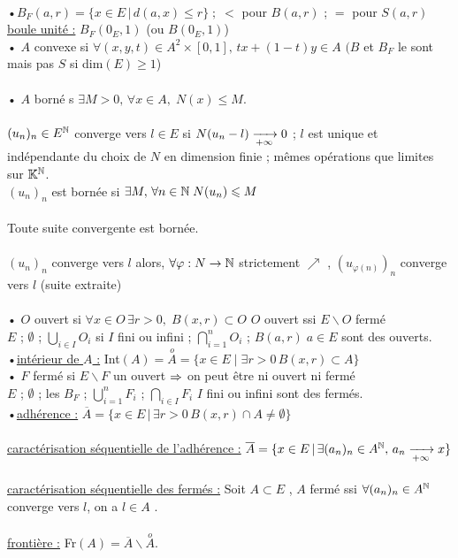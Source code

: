 \documentclass[12 pt]{exampleclass}
\begin{document}
\text{}\\
•$B_F(a,r) = \{x\in E \,|\, d(a,x)\leqslant r\} \; ; \; <$ pour $B(a,r)$ ; $ =$ pour $S(a,r)$\\
\underline{boule unité :} $B_F(0_E,1)$ \; (ou $B(0_E,1)$)\\
• $A$ convexe si $\forall(x,y,t)\in A^2\times [0,1], \, tx+(1-t)y \in A$  $(B$ et $B_F$ le sont mais pas $S$ si dim$(E) \geqslant 1$)\\
\text{}\\
• $A$ borné s $\exists M> 0, \, \forall x\in A, \; N(x)\leqslant M$.\\
\text{}\\
$(u_n)_n\in E^{\mathbb{N}}$ converge vers $l\in E$ si $N(u_n - l) \xrightarrow[+\infty]{} 0$ ; $l$ est unique et indépendante du choix de $N$ en dimension finie ; mêmes opérations que limites sur $\mathbb{K}^{\mathbb{N}}$.\\
$(u_n)_n$ est bornée si $\exists M, \, \forall n\in \mathbb{N} \; N(u_n)\leqslant M$\\
\text{}\\
Toute suite convergente est bornée.\\
\text{}\\
$(u_n)_n$ converge vers $l$ alors, $\forall \varphi : N \to \mathbb{N}$ strictement $\nearrow$ , $(u_{\varphi(n)})_n$ converge vers $l$ (suite extraite)\\
\text{}\\
• $O$ ouvert si $\forall x\in O \, \exists r>0 , \; B(x,r)\subset O$ \qquad \qquad \qquad $O$ ouvert ssi $E\backslash O$ fermé\\
$E$ ; $\emptyset$ ; $\bigcup_{i\in I} O_i$ si $I$ fini ou infini ; $\bigcap_{i =1}^n O_i$ ; $B(a,r) \; a\in E$ sont des ouverts.\\
•\underline{intérieur de $A$ :} Int$(A) = \overset{o}{A} = \{ x\in E \; | \; \exists r>0 \, B(x,r)\subset A\}$\\
• $F$ fermé si $E\backslash F$ un ouvert \qquad \qquad \qquad $\Rightarrow$ on peut être ni ouvert ni fermé \,\warning\\
$E$ ; $\emptyset$ ; les $B_F$ ; $\bigcup_{i=1}^n F_i$ ; $\bigcap_{i\in I} F_i$ $I$ fini ou infini sont des fermés.\\
•\underline{adhérence :} $\overline{A} = \{ x\in E\, |\, \exists r>0 \, B(x,r) \cap A \neq \emptyset \}$\\
\text{}\\
\underline{caractérisation séquentielle de l'adhérence :} $\overline{A} = \{ x\in E \, | \, \exists (a_n)_n \in A^{\mathbb{N}} , \, a_n \xrightarrow[+\infty]{} x\}$\\
\text{}\\
\underline{caractérisation séquentielle des fermés :} Soit $A\subset E$ , $A$ fermé ssi $\forall (a_n)_n\in A^{\mathbb{N}}$ converge vers $l$, on a $l \in A$ .\\
\text{}\\
\underline{frontière :} Fr$(A) = \overline{A}\backslash \overset{o}{A}$.\\
\end{document}
